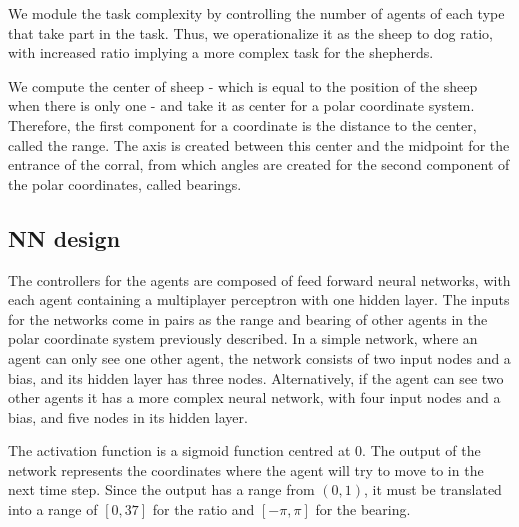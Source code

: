 \documentclass[conference]{IEEEtran}
\begin{document}
We module the task complexity by controlling the number of agents of each type that take part in the task. Thus, we operationalize it as the sheep to dog ratio, with increased ratio implying a more complex task for the shepherds.
 
We compute the center of sheep - which is equal to the position of the sheep when there is only one - and take it as center for a polar coordinate system. Therefore, the first component for a coordinate is the distance to the center, called the range. The axis is created between this center and the midpoint for the entrance of the corral, from which angles are created for the second component of the polar coordinates, called bearings. 


\subsection{NN design}
The controllers for the agents are composed of feed forward neural networks, with each agent containing a multiplayer perceptron with one hidden layer. The inputs for the networks come in pairs as the range and bearing of other agents in the polar coordinate system previously described. In a simple network, where an agent can only see one other agent, the network consists of two input nodes and a bias, and its hidden layer has three nodes. Alternatively, if the agent can see two other agents it has a more complex neural network, with four input nodes and a bias, and five nodes in its hidden layer. 

The activation function is a sigmoid function centred at 0. The output of the network represents the coordinates where the agent will try to move to in the next time step. Since the output has a range from $(0, 1)$, it must be translated into a range of $[0, 37]$ for the ratio and $[-\pi, \pi]$ for the bearing. 
 
\end{document}
